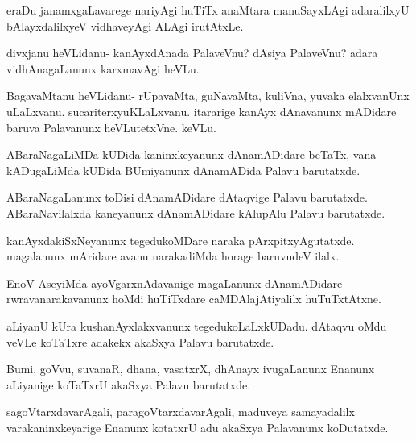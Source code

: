 \documentclass{article}
\begin{document}
\begin{mng}%
eraDu janamxgaLavarege nariyAgi huTiTx anaMtara manuSayxLAgi
adaralilxyU bAlayxdalilxyeV vidhaveyAgi ALAgi irutAtxLe.
\end{mng}

\begin{mng}%
divxjanu heVLidanu- kanAyxdAnada PalaveVnu? dAsiya PalaveVnu?
adara vidhAnagaLanunx karxmavAgi heVLu.
\end{mng}

\begin{mng}%
BagavaMtanu heVLidanu- rUpavaMta, guNavaMta, kuliVna,
yuvaka elalxvanUnx uLaLxvanu. sucariterxyuKLaLxvanu. itararige kanAyx
dAnavanunx mADidare baruva Palavanunx heVLutetxVne. keVLu.
\end{mng}

\begin{mng}%
ABaraNagaLiMDa kUDida kaninxkeyanunx dAnamADidare beTaTx, vana
kADugaLiMda kUDida BUmiyanunx dAnamADida Palavu barutatxde.
\end{mng}

\begin{mng}%
ABaraNagaLanunx toDisi dAnamADidare dAtaqvige Palavu
barutatxde. ABaraNavilalxda kaneyanunx dAnamADidare kAlupAlu Palavu
barutatxde.
\end{mng}

\begin{mng}%
kanAyxdakiSxNeyanunx tegedukoMDare naraka pArxpitxyAgutatxde.
magalanunx mAridare avanu narakadiMda horage baruvudeV ilalx.
\end{mng}

\begin{mng}%
EnoV AseyiMda ayoVgarxnAdavanige magaLanunx dAnamADidare
rwravanarakavanunx hoMdi huTiTxdare caMDAlajAtiyalilx huTuTxtAtxne.
\end{mng}

\begin{mng}%
aLiyanU kUra kushanAyxlakxvanunx tegedukoLaLxkUDadu.
dAtaqvu oMdu veVLe koTaTxre adakekx akaSxya Palavu barutatxde.
\end{mng}

\begin{mng}%
Bumi, goVvu, suvanaR, dhana, vasatxrX, dhAnayx ivugaLanunx
Enanunx aLiyanige koTaTxrU akaSxya Palavu barutatxde.
\end{mng}

\begin{mng}%
sagoVtarxdavarAgali, paragoVtarxdavarAgali, maduveya samayadalilx
varakaninxkeyarige Enanunx kotatxrU adu akaSxya Palavanunx koDutatxde.
\end{mng}
\end{document}
